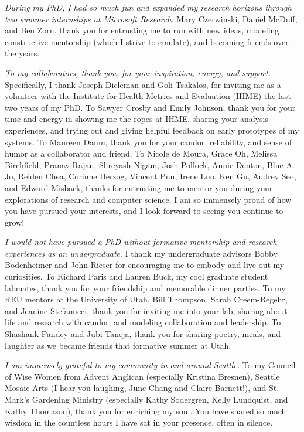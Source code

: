 \textit{During my PhD, I had so much fun and expanded my research horizons
through two summer internships at Microsoft Research.} Mary Czerwinski, Daniel
McDuff, and Ben Zorn, thank you for entrusting me to run with new ideas,
modeling constructive mentorship (which I strive to emulate), and becoming
friends over the years. 

\textit{To my collaborators, thank you, for your inspiration, energy, and support.}
Specifically, I thank Joseph Dieleman and Goli Tsakalos, for inviting me as
a volunteer with the Institute for Health Metrics and Evaluation (IHME) the
last two years of my PhD. To Sawyer Crosby and Emily Johnson, thank you for
your time and energy in showing me the ropes at IHME, sharing your analysis
experiences, and trying out and giving helpful feedback on early prototypes
of my systems. To Maureen Daum, thank you for your candor, reliability, and
sense of humor as a collaborator and friend. To Nicole de Moura, Grace Oh,
Melissa Birchfield, Pranav Rajan, Shreyash Nigam, Josh Pollock, Annie
Denton, Blue A. Jo, Reiden Chea, Corinne Herzog, Vincent Pun, Irene Luo, Ken
Gu, Audrey Seo, and Edward Misback, thanks for entrusting me to mentor you during your
explorations of research and computer science. I am so immensely proud of
how you have pursued your interests, and I look forward to seeing
you continue to grow!

\textit{I would not have pursued a PhD without formative mentorship and research
experiences as an undergraduate}. I thank my undergraduate advisors Bobby
Bodenheimer and John Rieser for encouraging me to embody and live out my
curiosities. To Richard Paris and Lauren Buck, my cool graduate student
labmates, thank you for your friendship and memorable dinner parties. To my REU
mentors at the University of Utah, Bill Thompson, Sarah Creem-Regehr, and
Jeanine Stefanucci, thank you for inviting me into your lab, sharing about life
and research with candor, and modeling collaboration and leadership. To Shashank
Pandey and Jubi Taneja, thank you for sharing poetry, meals, and laughter as we
became friends that formative summer at Utah.

\textit{I am immensely grateful to my community in and around Seattle.} To my
Council of Wise Women from Advent Anglican (especially Kristina Bresnen),
Seattle Mosaic Arts (I hear you laughing, June Chang and Claire Barnett!), and
St. Mark's Gardening Ministry (especially Kathy Sodergren, Kelly Lundquist,
and Kathy Thomason), thank you for enriching my soul. You have shared so much wisdom
in the countless hours I have sat in your presence, often in silence.

